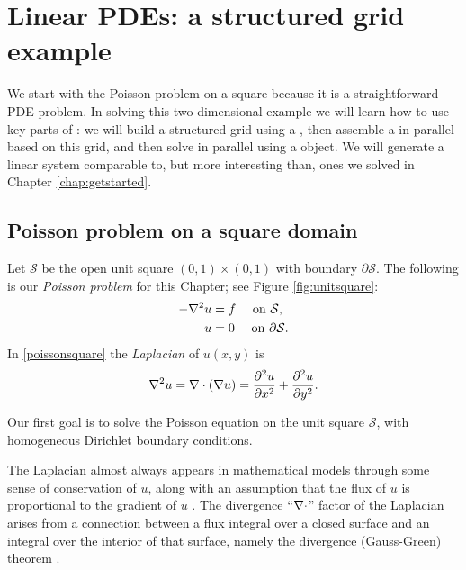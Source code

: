 
\chapter{Linear PDEs: a structured grid example}
\label{chap:structured}

We start with the Poisson problem on a square because it is a straightforward PDE problem.  In solving this two-dimensional example we will learn how to use key parts of \PETSc: we will build a structured grid using a \PETSc \pDMDA, then assemble a \pMat in parallel based on this grid, and then solve in parallel using a \pKSP object.  We will generate a linear system comparable to, but more interesting than, ones we solved in Chapter \ref{chap:getstarted}.

\section{Poisson problem on a square domain}

Let $\mathcal{S}$ be the open unit square $(0,1)\times(0,1)$ with boundary $\partial\mathcal{S}$.  The following is our \emph{Poisson problem} for this Chapter;  see Figure \ref{fig:unitsquare}:
\begin{align}
- \nabla^2 u &= f \quad \text{ on } \mathcal{S}, \label{poissonsquare} \\
u &= 0 \quad \text{ on } \partial \mathcal{S}. \label{poissonsquarebcs}
\end{align}
In \eqref{poissonsquare} the \emph{Laplacian} of $u(x,y)$ is
    $$\nabla^2 u = \nabla\cdot(\nabla u) = \frac{\partial^2 u}{\partial x^2} + \frac{\partial^2 u}{\partial y^2}.$$

\begin{marginfigure}
\caption{Our first goal is to solve the Poisson equation on the unit square $\mathcal{S}$, with homogeneous Dirichlet boundary conditions.}
\label{fig:unitsquare}
\end{marginfigure}

The Laplacian almost always appears in mathematical models through some sense of conservation of $u$, along with an assumption that the flux of $u$ is proportional to the gradient of $u$ \citep{Ockendonetal2003}.  The divergence ``$\nabla\cdot$'' factor of the Laplacian arises from a connection between a flux integral over a closed surface and an integral over the interior of that surface, namely the divergence (Gauss-Green) theorem \citep[Appendix C]{Evans}.

